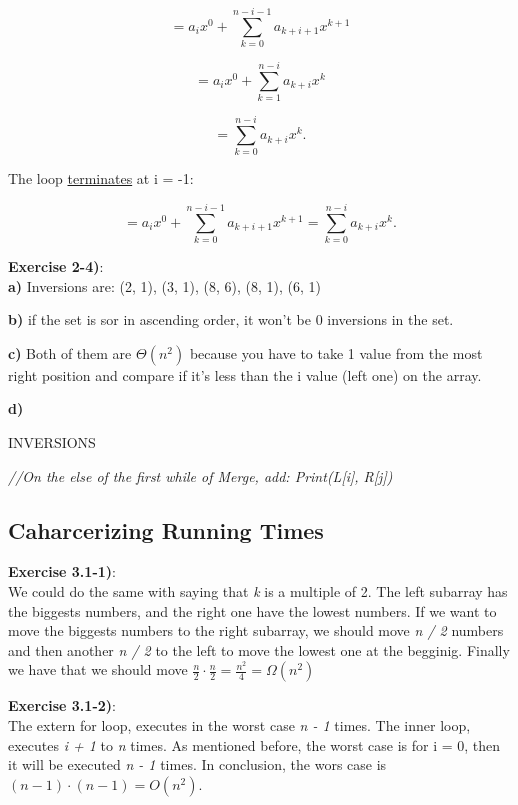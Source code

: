 \documentclass{article}
\newcounter{exercise}[section]   %
\begin{document}
\[
= a_i x^0 + \sum_{k=0}^{n-i-1} a_{k+i+1} x^{k+1}
\]

\[
= a_i x^0 + \sum_{k=1}^{n-i} a_{k+i} x^k
\]

\[
= \sum_{k=0}^{n-i} a_{k+i} x^k.
\]

The loop \underline{terminates} at i = -1:

\[
= a_i x^0 + \sum_{k=0}^{n-i-1} a_{k+i+1} x^{k+1} = \sum_{k=0}^{n-i} a_{k+i} x^k.
\]

\textbf{Exercise 2-4)}:\\
\textbf{a)} Inversions are: (2, 1), (3, 1), (8, 6), (8, 1), (6, 1)

\textbf{b)} if the set is sor in ascending order, it won't be 0 inversions in the set.

\textbf{c)} Both of them are \(\Theta(n^2)\) because you have to take 1 value from the most
right position and compare if it's less than the i value (left one) on the array.

\textbf{d)}
\begin{algorithm}
    \caption{INVERSIONS}\label{InversionID}
    \begin{algorithmic}[1]
            \State \textit{//On the else of the first while of Merge, add: Print(L[i], R[j])}
        \EndFunction
    \end{algorithmic}
\end{algorithm}


\subsection{Caharcerizing Running Times}
\setcounter{exercise}{0}

\textbf{Exercise 3.1-1)}:\\
We could do the same with saying that \textit{k} is a multiple of 2. The left subarray
has the biggests numbers, and the right one have the lowest numbers. If we want to move the
biggests numbers to the right subarray, we should move \textit{n / 2} numbers and then another
\textit{n / 2} to the left to move the lowest one at the begginig. Finally we have that
we should move \(\frac{n}{2} \cdot \frac{n}{2} = \frac{n^2}{4} = \Omega(n^2)\)

\textbf{Exercise 3.1-2)}:\\
The extern for loop, executes in the worst case \textit{n - 1}  times. The inner loop, executes 
\textit{i + 1} to \textit{n} times. As mentioned before, the worst case is for i = 0, then
it will be executed \textit{n - 1} times. In conclusion, the wors case is \((n - 1) \cdot 
(n - 1) = O(n^2)\).
\end{document}
